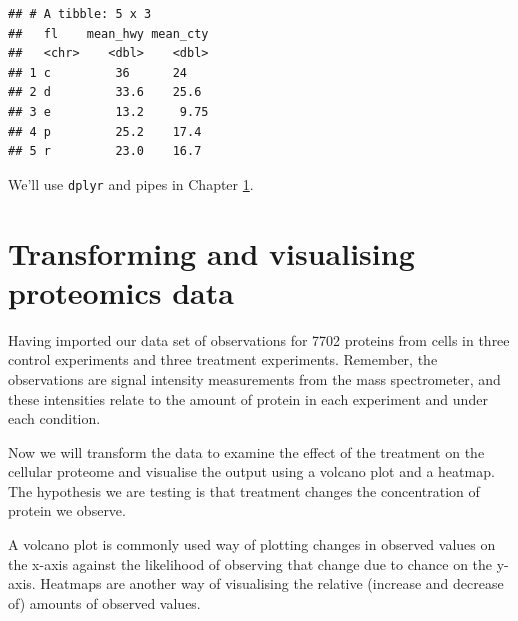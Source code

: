 \documentclass[12pt,]{book}
\newenvironment{Shaded}{\begin{snugshade}}{\end{snugshade}}
\newcommand{\KeywordTok}[1]{\textcolor[rgb]{0.13,0.29,0.53}{\textbf{#1}}}
\newcommand{\DataTypeTok}[1]{\textcolor[rgb]{0.13,0.29,0.53}{#1}}
\newcommand{\StringTok}[1]{\textcolor[rgb]{0.31,0.60,0.02}{#1}}
\newcommand{\CommentTok}[1]{\textcolor[rgb]{0.56,0.35,0.01}{\textit{#1}}}
\newcommand{\OperatorTok}[1]{\textcolor[rgb]{0.81,0.36,0.00}{\textbf{#1}}}
\newcommand{\NormalTok}[1]{#1}
\theoremstyle{definition}
\theoremstyle{definition}
\theoremstyle{definition}
\theoremstyle{remark}
\begin{document}
\begin{Shaded}
\end{Shaded}

\begin{verbatim}
## # A tibble: 5 x 3
##   fl    mean_hwy mean_cty
##   <chr>    <dbl>    <dbl>
## 1 c         36      24   
## 2 d         33.6    25.6 
## 3 e         13.2     9.75
## 4 p         25.2    17.4 
## 5 r         23.0    16.7
\end{verbatim}

We'll use \texttt{dplyr} and pipes in Chapter \ref{transform}.

\chapter{Transforming and visualising proteomics data}\label{transform}

Having imported our data set of observations for 7702 proteins from
cells in three control experiments and three treatment experiments.
Remember, the observations are signal intensity measurements from the
mass spectrometer, and these intensities relate to the amount of protein
in each experiment and under each condition.

Now we will transform the data to examine the effect of the treatment on
the cellular proteome and visualise the output using a volcano plot and
a heatmap. The hypothesis we are testing is that treatment changes the
concentration of protein we observe.

A volcano plot is commonly used way of plotting changes in observed
values on the x-axis against the likelihood of observing that change due
to chance on the y-axis. Heatmaps are another way of visualising the
relative (increase and decrease of) amounts of observed values.
\end{document}
